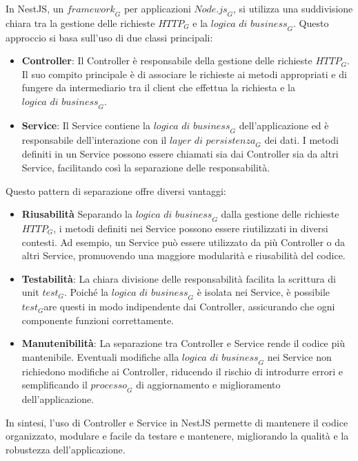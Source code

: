 In NestJS, un $\textit{framework}_G$ per applicazioni $\textit{Node.js}_G$, si utilizza una suddivisione chiara tra la gestione delle richieste $\textit{HTTP}_G$ e la $\textit{logica di business}_G$. Questo approccio si basa sull'uso di due classi principali:

\begin{itemize}
    \item \textbf{Controller}: Il Controller è responsabile della gestione delle richieste $\textit{HTTP}_G$. Il suo compito principale è di associare le richieste ai metodi appropriati e di fungere da intermediario tra il client che effettua la richiesta e la $\textit{logica di business}_G$.
    
    \item \textbf{Service}: Il Service contiene la $\textit{logica di business}_G$ dell'applicazione ed è responsabile dell'interazione con il $\textit{layer di persistenza}_G$ dei dati. I metodi definiti in un Service possono essere chiamati sia dai Controller sia da altri Service, facilitando così la separazione delle responsabilità.
\end{itemize}
Questo pattern di separazione offre diversi vantaggi:

\begin{itemize}
    \item \textbf{Riusabilità} Separando la $\textit{logica di business}_G$ dalla gestione delle richieste $\textit{HTTP}_G$, i metodi definiti nei Service possono essere riutilizzati in diversi contesti. Ad esempio, un Service può essere utilizzato da più Controller o da altri Service, promuovendo una maggiore modularità e riusabilità del codice.
    
    \item \textbf{Testabilità}: La chiara divisione delle responsabilità facilita la scrittura di unit $\textit{test}_G$. Poiché la $\textit{logica di business}_G$ è isolata nei Service, è possibile $\textit{test}_G$are questi in modo indipendente dai Controller, assicurando che ogni componente funzioni correttamente.
    
    \item \textbf{Manutenibilità}: La separazione tra Controller e Service rende il codice più mantenibile. Eventuali modifiche alla $\textit{logica di business}_G$ nei Service non richiedono modifiche ai Controller, riducendo il rischio di introdurre errori e semplificando il $\textit{processo}_G$ di aggiornamento e miglioramento dell'applicazione.
    
\end{itemize}
In sintesi, l'uso di Controller e Service in NestJS permette di mantenere il codice organizzato, modulare e facile da testare e mantenere, migliorando la qualità e la robustezza dell'applicazione.

